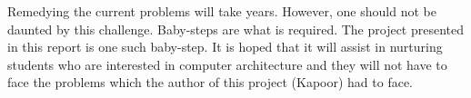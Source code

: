 Remedying the current problems will take years. However, one should not be daunted by this challenge. Baby-steps are what is required. The project presented in this report is one such baby-step. It is hoped that it will assist in nurturing students who are interested in computer architecture and they will not have to face the problems which the author of this project (Kapoor) had to face.

